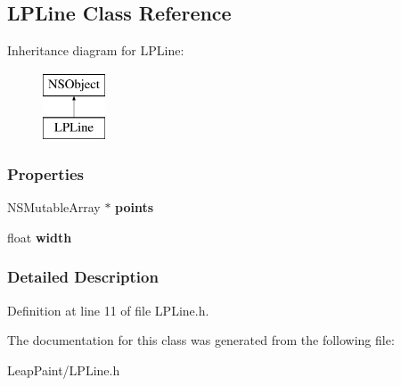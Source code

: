 \hypertarget{interface_l_p_line}{\subsection{L\-P\-Line Class Reference}
\label{df/dbc/interface_l_p_line}
}
Inheritance diagram for L\-P\-Line\-:\begin{figure}[H]
\begin{center}
\leavevmode
\includegraphics[height=2.000000cm]{df/dbc/interface_l_p_line}
\end{center}
\end{figure}
\subsubsection*{Properties}
\begin{DoxyCompactItemize}
\item 
\hypertarget{interface_l_p_line_a3f5edffc9c461de1a0cbda01de250bd2}{N\-S\-Mutable\-Array $\ast$ {\bfseries points}}\label{df/dbc/interface_l_p_line_a3f5edffc9c461de1a0cbda01de250bd2}

\item 
\hypertarget{interface_l_p_line_a4d06bc7cac330ed07213cb50229313fd}{float {\bfseries width}}\label{df/dbc/interface_l_p_line_a4d06bc7cac330ed07213cb50229313fd}

\end{DoxyCompactItemize}


\subsubsection{Detailed Description}


Definition at line 11 of file L\-P\-Line.\-h.



The documentation for this class was generated from the following file\-:\begin{DoxyCompactItemize}
\item 
Leap\-Paint/L\-P\-Line.\-h\end{DoxyCompactItemize}
